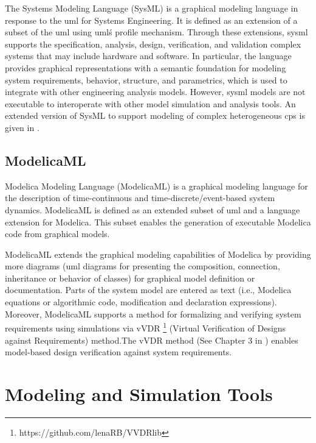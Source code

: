 The Systems Modeling Language (SysML) \cite{sysml} is a graphical modeling language in response to the \acrshort{uml} for Systems Engineering. It is defined as an extension of a subset of the \acrshort{uml} using \acrshort{uml}\'s profile mechanism. Through these extensions, \acrshort{sysml} supports the specification, analysis, design, verification, and validation complex systems that may include hardware and software. In particular, the language provides graphical representations with a semantic foundation for modeling system requirements, behavior, structure, and parametrics, which is used to integrate with other engineering analysis models. However, \acrshort{sysml} models are not executable to interoperate with other model simulation and analysis tools. An extended version of SysML to support modeling of complex heterogeneous \acrshort{cps} is given in \cite{mbsdjensen}. 

\subsection{ModelicaML}
\label{sec:modelicaml}

Modelica Modeling Language (ModelicaML) \cite{modelicaml, modelicamlreport} is a graphical modeling language for the description of time-continuous and time-discrete/event-based system dynamics. ModelicaML is defined as an extended subset of \acrshort{uml} and a language extension for Modelica. This subset enables the generation of executable Modelica code from graphical models.

ModelicaML extends the graphical modeling capabilities of Modelica by providing more diagrams (\acrshort{uml} diagrams for presenting the composition, connection, inheritance or behavior of classes) for graphical model definition or documentation.  Parts of the system model are entered as text (i.e., Modelica equations or algorithmic code, modification and declaration expressions). Moreover, ModelicaML supports a method for formalizing and verifying system requirements using simulations via vVDR \footnote{https://github.com/lenaRB/VVDRlib} (Virtual Verification of Designs against Requirements) method.The vVDR method (See Chapter 3 in \cite{modelicamlwladimir, modelicamlverification}) enables model-based design verification against system requirements.


\section{Modeling and Simulation Tools}
\label{sec:tools}

